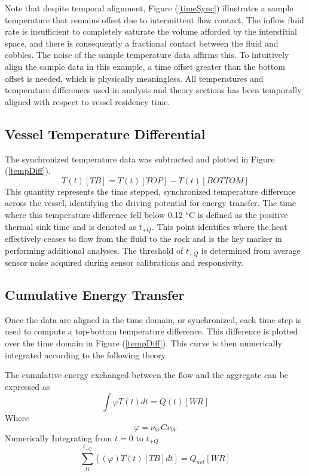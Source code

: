 Note that despite temporal alignment, Figure (\ref{timeSync}) illustrates a sample temperature that remains offset due to intermittent flow contact. The inflow fluid rate is insufficient to completely saturate the volume afforded by the interstitial space, and there is consequently a fractional contact between the fluid and cobbles. The noise of the sample temperature data affirms this. To intuitively align the sample data in this example, a time offset greater than the bottom offset is needed, which is physically meaningless. All temperatures and temperature differences used in analysis and theory sections has been temporally aligned with respect to vessel residency time. 

\subsection{Vessel Temperature Differential}
The synchronized temperature data was subtracted and plotted in Figure (\ref{tempDiff}).  
\[T(t)[TB]=T(t)[TOP]-T(t)[BOTTOM]\]
This quantity represents the time stepped, synchronized temperature difference across the vessel, identifying the driving potential for energy transfer. The time where this temperature difference fell below 0.12 $^{o}$C is defined as the positive thermal sink time and is denoted as $t_{+Q}$. This point identifies where the heat effectively ceases to flow from the fluid to the rock and is the key marker in performing additional analyses. The threshold of $t_{+Q}$ is determined from average sensor noise acquired during sensor calibrations and responsivity.
\pagebreak
\subsection{Cumulative Energy Transfer}
Once the data are aligned in the time domain, or synchronized, each time step is used to compute a top-bottom temperature difference. This difference is plotted over the time domain in Figure (\ref{tempDiff}). This curve is then numerically integrated according to the following theory.

\noindent The cumulative energy exchanged between the flow and the aggregate can be expressed as
\[\int \varphi T(t)dt=Q(t)[WR]\]
Where
\[\varphi = \nu_{W}Cv_{W}\]
Numerically Integrating from $t=0$ to $t_{+Q}$
\begin{equation}\label{NSCF}
\sum_{ti}^{t_{+Q}}\left[\left(\varphi\right)T(t)[TB]dt\right]=Q_{net}[WR]
\end{equation}


